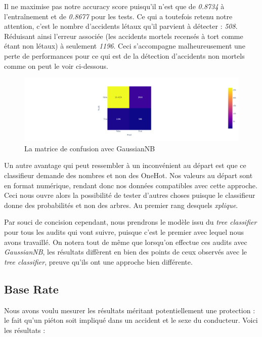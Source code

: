 \documentclass{article}
\begin{document}
    Il ne maximise pas notre accuracy score puisqu'il n'est que de \textit{0.8734} à l'entraînement et de \textit{0.8677} pour les tests. Ce qui 
    a toutefois retenu notre attention, c'est le nombre d'accidents létaux qu'il parvient à détecter : \textit{508}. Réduisant ainsi l'erreur associée
    (les accidents mortels recensés à tort comme étant non létaux) à seulement \textit{1196}. Ceci s'accompagne malheureusement une perte de performances 
    pour ce qui est de la détection d'accidents non mortels comme on peut le voir ci-dessous.

    \begin{figure}[h]
        \centering
        \includegraphics[width=\textwidth]{./img/matrice_confusion_gaussien.png}
        \caption{La matrice de confusion avec GaussianNB}
    \end{figure}

    Un autre avantage qui peut ressembler à un inconvénient au départ est que ce classifieur demande des nombres et non des OneHot.
    Nos valeurs au départ sont en format numérique, rendant donc nos données compatibles avec cette approche.
    Ceci nous ouvre alors la possibilité de tester d'autres choses puisque le classifieur donne des probabilités et non des arbres. Au premier 
    rang desquels \textit{xplique}.
        
    Par souci de concision cependant, nous prendrons le modèle issu du \textit{tree classifier} pour tous les audits qui vont suivre, 
    puisque c'est le premier avec lequel nous avons travaillé. On notera tout de même que lorsqu'on effectue ces audits avec \textit{GaussianNB}, 
    les résultats diffèrent en bien des points de ceux observés avec le \textit{tree classifier}, preuve qu'ils ont une approche bien différente.

    \subsection{Base Rate}

    Nous avons voulu mesurer les résultats méritant potentiellement une protection : le fait qu'un piéton soit impliqué dans 
    un accident et le sexe du conducteur. Voici les résultats :
\end{document}
